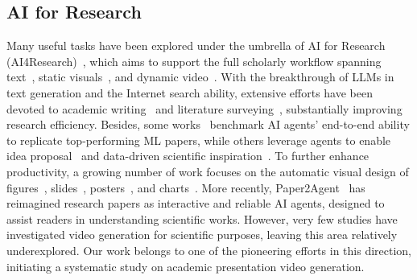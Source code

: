 
\vspace{-0.2\baselineskip} 
\subsection{AI for Research}
\vspace{-0.2\baselineskip} 
Many useful tasks have been explored under the umbrella of AI for Research (AI4Research)~\cite{ai4research}, which aims to support the full scholarly workflow spanning text~\cite{dasigi-etal}, static visuals~\cite{pang2025paper2poster}, and dynamic video~\cite{shi2025presentagent}. With the breakthrough of LLMs in text generation and the Internet search ability, extensive efforts have been devoted to academic writing~\cite{writing_ass} and literature surveying~\cite{sci_lit,deyoung2021ms2,multi-xscience,goldsack2022making}, substantially improving research efficiency. Besides, some works~\cite{paperbench,scireplicate} benchmark AI agents’ end-to-end ability to replicate top-performing ML papers, while others leverage agents to enable idea proposal~\cite{Llm-srbench} and data-driven scientific inspiration~\cite{scienceagentbench,bixbench}. 
To further enhance productivity, a growing number of work focuses on the automatic visual design of figures~\cite{IconShop}, slides~\cite{zheng2025pptagent}, posters~\cite{pang2025paper2poster}, and charts~\cite{hu2024novachart}. More recently, Paper2Agent~\cite{paper2agent} has reimagined research papers as interactive and reliable AI agents, designed to assist readers in understanding scientific works. However, very few studies have investigated video generation for scientific purposes, leaving this area relatively underexplored. Our work belongs to one of the pioneering efforts in this direction, initiating a systematic study on academic presentation video generation.





